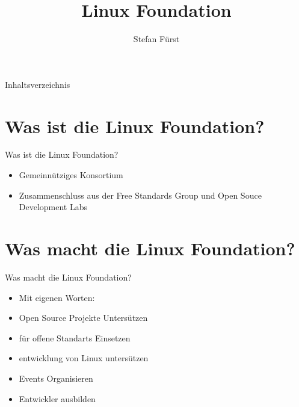\documentclass[11pt,aspectratio=169]{beamer}
\title {Linux Foundation}
\author{Stefan Fürst}
\institute{Htl Donaustadt}
\begin{document}
\begin{frame}
	\maketitle
\end{frame}

\begin{frame}{Inhaltsverzeichnis}
	\tableofcontents
\end{frame}
\section{Was ist die Linux Foundation?}
\begin{frame}{Was ist die Linux Foundation?}
	\begin{itemize}
		\item Gemeinnütziges Konsortium \cite{NPO}
		\item Zusammenschluss aus der Free Standards Group und Open Souce Development Labs\cite{Zusamenschluss}
	\end{itemize}
\end{frame}
\section{Was macht die Linux Foundation?}

\begin{frame}{Was macht die Linux Foundation?}
	\begin{itemize}
		\item<1-> Mit eigenen Worten:\cite{About}
		\item<2-> Open Source Projekte Untersützen
		\item<3-> für offene Standarts Einsetzen
		\item <4->entwicklung von Linux untersützen
		\item<5-> Events Organisieren\cite{Events}
		\item<6-> Entwickler ausbilden\cite{Training}
	\end{itemize}

\end{frame}
\end{document}
